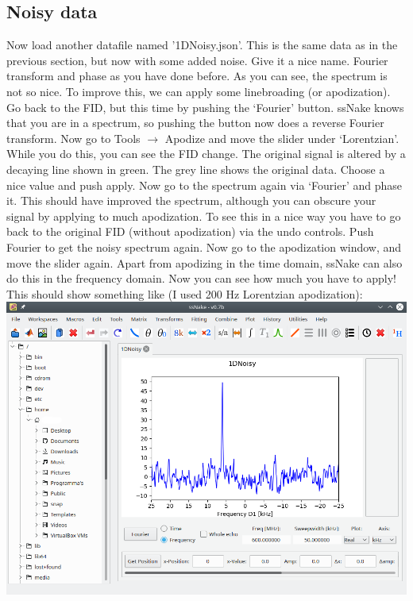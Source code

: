 \documentclass[11pt,a4paper]{article}
\begin{document}
\subsection{Noisy data}
Now load another datafile named '1DNoisy.json'. This is the same data as in the previous section,
but now with some added noise. Give it a nice name. Fourier transform and phase as you have done
before. As you can see, the spectrum is not so nice. To improve this, we can apply some linebroading
(or apodization). Go back to the FID, but this time by pushing the `Fourier' button. ssNake knows
that you are in a spectrum, so pushing the button now does a reverse Fourier transform. Now go to
Tools $\rightarrow$ Apodize and move the slider under `Lorentzian'. While you do this, you can see
the FID change. The original signal is altered by a decaying line shown in green. The grey line
shows the original data. Choose a nice value and push apply. Now go to the spectrum again via
`Fourier' and phase it. This should have improved the spectrum, although you can obscure your signal
by applying to much apodization. To see this in a nice way you have to go back to the original FID
(without apodization) via the undo controls. Push Fourier to get the noisy spectrum again. Now go to
the apodization window, and move the slider again. Apart from apodizing in the time domain, ssNake
can also do this in the frequency domain. Now you can see how much you have to apply! This should
show something like (I used 200 Hz Lorentzian apodization):\\
\includegraphics[width=\linewidth]{Images/1DnoisyProcessed.png}
\end{document}
